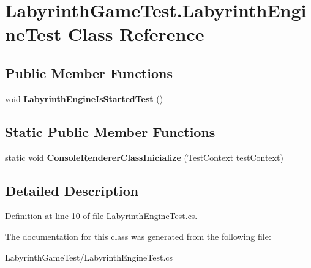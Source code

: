 \hypertarget{class_labyrinth_game_test_1_1_labyrinth_engine_test}{\section{Labyrinth\+Game\+Test.\+Labyrinth\+Engine\+Test Class Reference}
\label{class_labyrinth_game_test_1_1_labyrinth_engine_test}
}
\subsection*{Public Member Functions}
\begin{DoxyCompactItemize}
\item 
\hypertarget{class_labyrinth_game_test_1_1_labyrinth_engine_test_af38930f7ec901cf97010ee6c3730b8e5}{void {\bfseries Labyrinth\+Engine\+Is\+Started\+Test} ()}\label{class_labyrinth_game_test_1_1_labyrinth_engine_test_af38930f7ec901cf97010ee6c3730b8e5}

\end{DoxyCompactItemize}
\subsection*{Static Public Member Functions}
\begin{DoxyCompactItemize}
\item 
\hypertarget{class_labyrinth_game_test_1_1_labyrinth_engine_test_a427caaaab82bbff0dd475a72e6d83ef2}{static void {\bfseries Console\+Renderer\+Class\+Inicialize} (Test\+Context test\+Context)}\label{class_labyrinth_game_test_1_1_labyrinth_engine_test_a427caaaab82bbff0dd475a72e6d83ef2}

\end{DoxyCompactItemize}


\subsection{Detailed Description}


Definition at line 10 of file Labyrinth\+Engine\+Test.\+cs.



The documentation for this class was generated from the following file\+:\begin{DoxyCompactItemize}
\item 
Labyrinth\+Game\+Test/Labyrinth\+Engine\+Test.\+cs\end{DoxyCompactItemize}

